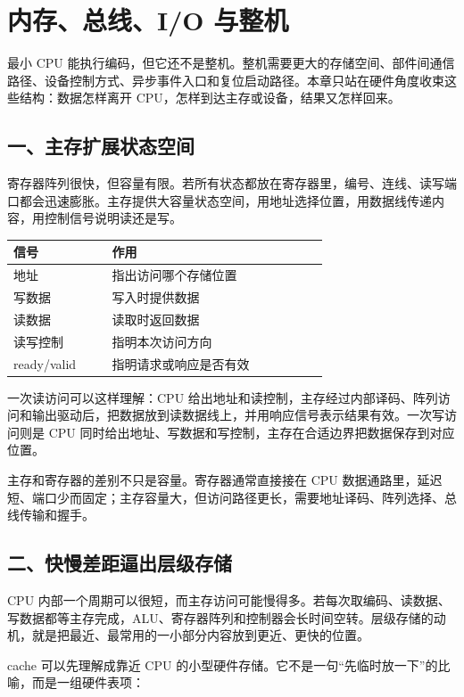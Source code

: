 \chapter{内存、总线、I/O 与整机}

最小 CPU 能执行编码，但它还不是整机。整机需要更大的存储空间、部件间通信路径、设备控制方式、异步事件入口和复位启动路径。本章只站在硬件角度收束这些结构：数据怎样离开 CPU，怎样到达主存或设备，结果又怎样回来。

\section{一、主存扩展状态空间}

寄存器阵列很快，但容量有限。若所有状态都放在寄存器里，编号、连线、读写端口都会迅速膨胀。主存提供大容量状态空间，用地址选择位置，用数据线传递内容，用控制信号说明读还是写。

\begin{longtable}{p{0.2\linewidth}p{0.5\linewidth}}
\toprule
信号 & 作用 \\
\midrule
地址 & 指出访问哪个存储位置 \\
写数据 & 写入时提供数据 \\
读数据 & 读取时返回数据 \\
读写控制 & 指明本次访问方向 \\
ready/valid & 指明请求或响应是否有效 \\
\bottomrule
\end{longtable}

一次读访问可以这样理解：CPU 给出地址和读控制，主存经过内部译码、阵列访问和输出驱动后，把数据放到读数据线上，并用响应信号表示结果有效。一次写访问则是 CPU 同时给出地址、写数据和写控制，主存在合适边界把数据保存到对应位置。

主存和寄存器的差别不只是容量。寄存器通常直接接在 CPU 数据通路里，延迟短、端口少而固定；主存容量大，但访问路径更长，需要地址译码、阵列选择、总线传输和握手。

\section{二、快慢差距逼出层级存储}

CPU 内部一个周期可以很短，而主存访问可能慢得多。若每次取编码、读数据、写数据都等主存完成，ALU、寄存器阵列和控制器会长时间空转。层级存储的动机，就是把最近、最常用的一小部分内容放到更近、更快的位置。

cache 可以先理解成靠近 CPU 的小型硬件存储。它不是一句“先临时放一下”的比喻，而是一组硬件表项：

